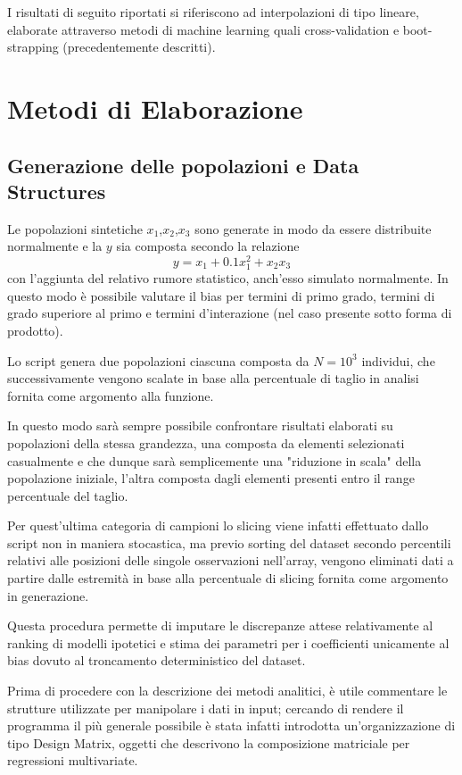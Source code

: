 \documentclass[a4paper]{report}
\begin{document}
I risultati di seguito riportati si riferiscono ad interpolazioni di tipo lineare, elaborate attraverso metodi di machine learning quali cross-validation e boot-strapping (precedentemente descritti).

\section{Metodi di Elaborazione}
\subsection {Generazione delle popolazioni e Data Structures}
Le popolazioni sintetiche $x_1$,$x_2$,$x_3$ sono generate in modo da essere distribuite normalmente e la $y$ sia composta secondo la relazione \[y=x_1+0.1x_1^2+x_2x_3\]con l'aggiunta del relativo rumore statistico, anch'esso simulato normalmente.
In questo modo è possibile valutare il bias per termini di primo grado, termini di grado superiore al primo e termini d'interazione (nel caso presente sotto forma di prodotto).

Lo script genera due popolazioni ciascuna composta da $N=10^3$ individui, che successivamente vengono scalate in base alla percentuale di taglio in analisi fornita come argomento alla funzione.

In questo modo sarà sempre possibile confrontare risultati elaborati su popolazioni della stessa grandezza, una composta da elementi selezionati casualmente e che dunque sarà semplicemente una "riduzione in scala" della popolazione iniziale, l'altra composta dagli elementi presenti entro il range percentuale del taglio.

Per quest'ultima categoria di campioni lo slicing viene infatti effettuato dallo script non in maniera stocastica, ma previo sorting del dataset secondo percentili relativi alle posizioni delle singole osservazioni nell'array, vengono eliminati dati a partire dalle estremità in base alla percentuale di slicing fornita come argomento in generazione.

Questa procedura permette di imputare le discrepanze attese relativamente al ranking di modelli ipotetici e stima dei parametri per i coefficienti unicamente al bias dovuto al troncamento deterministico del dataset.

Prima di procedere con la descrizione dei metodi analitici, è utile commentare le strutture utilizzate per manipolare i dati in input; cercando di rendere il programma il più generale possibile è stata infatti introdotta un'organizzazione di tipo Design Matrix, oggetti che descrivono la  composizione matriciale per regressioni multivariate.
\end{document}
